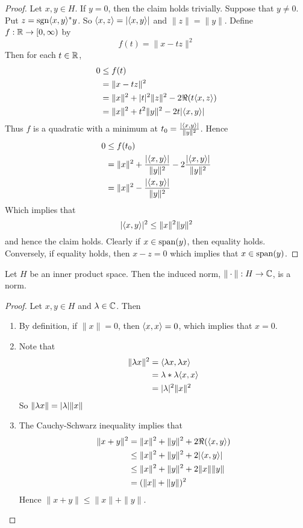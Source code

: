\documentclass{book}
\begin{document}
\begin{proof}
Let $x,y \in H$. If $y = 0$, then the claim holds trivially. Suppose that $y \neq 0$. Put $z = \operatorname{sgn}\langle x, y \rangle^*y$. So $\langle x, z\rangle = |\langle x,y \rangle |$ and $\|z\| = \|y\|$. Define $f: \mathbb{R} \rightarrow [0,\infty)$ by 
$$f(t) = \|x - tz\|^2$$ 
Then for each $t \in \mathbb{R}$, 
\begin{align*}
0 
& \leq f(t) \\
&=  \|x - tz\|^2 \\
&= \|x\|^2 + |t|^2\|z\|^2 - 2 \Re(t \langle x,z \rangle) \\
&= \|x\|^2 + t^2\|y\|^2 - 2 t |\langle x,y \rangle| \\
\end{align*} 
Thus $f$ is a quadratic with a minimum at $t_0 = \frac{|\langle x, y \rangle|}{\|y\|^2}$. Hence 
\begin{align*}
0 
&\leq f(t_0) \\
&= \|x\|^2 +  \frac{|\langle x, y \rangle|}{\|y\|^2} - 2\frac{|\langle x, y \rangle|}{\|y\|^2} \\
& = \|x\|^2 -  \frac{|\langle x, y \rangle|}{\|y\|^2}
\end{align*}
Which implies that $$| \langle x, y\rangle |^2 \leq \|x\|^2 \| y\|^2$$ and hence the claim holds. Clearly if $x \in \operatorname{span}(y)$, then equality holds. Conversely, if equality holds, then $x-z = 0$ which implies that $x \in \operatorname{span}(y)$.
\end{proof}

\begin{ex} \lex{}
Let $H$ be an inner product space. Then the induced norm, $\| \cdot\|: H \rightarrow \mathbb{C}$, is a norm. 
\end{ex}

\begin{proof}Let $x,y \in H$ and $\lambda \in \mathbb{C}$. Then
\begin{enumerate}
\item By definition, if $\|x\| = 0$, then $\langle x, x \rangle =0$, which implies that $x =0$.
\item Note that 
\begin{align*}
\| \lambda x \|^2 
&= \langle \lambda x, \lambda x \rangle \\
&= \lambda *\lambda  \langle x, x\rangle \\
&= |\lambda |^2\| x \|^2
\end{align*}
So $\| \lambda x \| = |\lambda |\|x\|$
\item The Cauchy-Schwarz inequality implies that
\begin{align*}
\|x + y\|^2 
&= \|x\|^2 + \|y\|^2 + 2 \Re(\langle x, y\rangle) \\
& \leq \|x\|^2 + \|y\|^2 + 2 |\langle x, y\rangle | \\
& \leq \|x\|^2 + \|y\|^2 + 2 \|x\| \|y\| \\
&= (\|x\| + \|y\|)^2
\end{align*}
Hence $\|x + y\| \leq \|x\| + \|y\|$.
\end{enumerate}
\end{proof}
\end{document}
